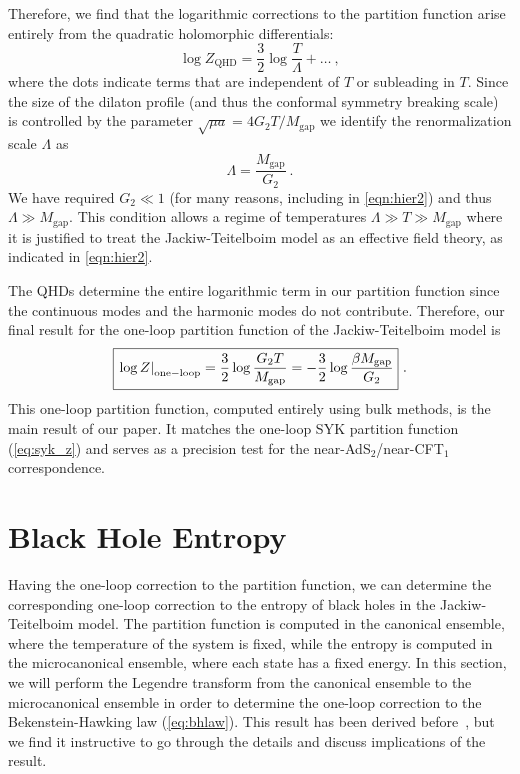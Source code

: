 \documentclass[12pt]{article}
\begin{document}
Therefore, we find that the logarithmic corrections to the partition function arise entirely from the quadratic holomorphic differentials:
\begin{equation}
	\log Z_\text{QHD} = \frac{3}{2}\log \frac{T}{\Lambda} + \ldots~,
\end{equation}
where the dots indicate terms that are independent of $T$ or subleading in $T$.  Since the size of the dilaton profile (and thus the conformal symmetry breaking scale) is controlled by the parameter $\sqrt{\mu a} = 4 G_2 T / M_\text{gap}$ we identify the renormalization scale $\Lambda$ as
\begin{equation}
	\Lambda = \frac{M_\text{gap}}{G_2}~.
\end{equation}
We have required $G_2 \ll 1$ (for many reasons, including in \eqref{eqn:hier2}) and thus $\Lambda\gg M_\text{gap}$. This condition allows a regime of temperatures 
$\Lambda\gg T\gg M_\text{gap}$ where it is justified to treat the Jackiw-Teitelboim model as an effective field theory, as indicated in \eqref{eqn:hier2}.

The QHDs determine the entire logarithmic term in our partition function since the continuous modes and the harmonic modes do not contribute.  Therefore, our final result for the one-loop partition function of the Jackiw-Teitelboim model is
\begin{equation}
	\boxed{\left. \log Z \right|_{\rm one-loop}= \frac{3}{2} \log \frac{G_2 T}{M_\text{gap}} = - \frac{3}{2} \log \frac{\beta M_\text{gap}}{G_2}}~.
\label{eq:result}
\end{equation}
This one-loop partition function, computed entirely using bulk methods, is the main result of our paper.  It matches the one-loop SYK partition function (\ref{eq:syk_z}) and serves as a precision test for the near-AdS$_2$/near-CFT$_1$ correspondence.  

\section{Black Hole Entropy}
\label{sec:bhentropy}

Having the one-loop correction to the partition function, we can determine the corresponding one-loop correction to the entropy of black holes in the Jackiw-Teitelboim model.  The partition function is computed in the canonical ensemble, where the temperature of the system is fixed, while the entropy is computed in the microcanonical ensemble, where each state has a fixed energy.  In this section, we will perform the Legendre transform from the canonical ensemble to the microcanonical ensemble in order to determine the one-loop correction to the Bekenstein-Hawking law (\ref{eq:bhlaw}).  This result has been derived before~\cite{Maldacena:2016hyu}, but we find it instructive to go through the details and discuss implications of the result.
\end{document}

